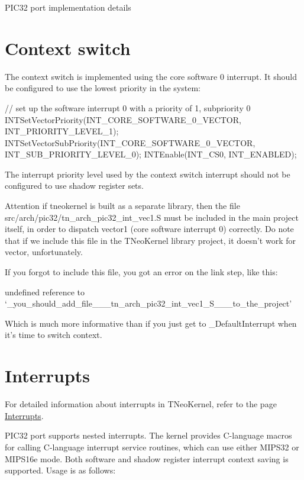 P\+I\+C32 port implementation details\hypertarget{pic32_details_pic32_context_switch}{}\section{Context switch}\label{pic32_details_pic32_context_switch}
The context switch is implemented using the core software 0 interrupt. It should be configured to use the lowest priority in the system\+:


\begin{DoxyCode}
\textcolor{comment}{// set up the software interrupt 0 with a priority of 1, subpriority 0}
INTSetVectorPriority(INT\_CORE\_SOFTWARE\_0\_VECTOR, INT\_PRIORITY\_LEVEL\_1);
INTSetVectorSubPriority(INT\_CORE\_SOFTWARE\_0\_VECTOR, INT\_SUB\_PRIORITY\_LEVEL\_0);
INTEnable(INT\_CS0, INT\_ENABLED);
\end{DoxyCode}


The interrupt priority level used by the context switch interrupt should not be configured to use shadow register sets.

\begin{DoxyAttention}{Attention}
if tneokernel is built as a separate library, then the file {\ttfamily src/arch/pic32/tn\+\_\+arch\+\_\+pic32\+\_\+int\+\_\+vec1.\+S} must be included in the main project itself, in order to dispatch vector1 (core software interrupt 0) correctly. Do note that if we include this file in the T\+Neo\+Kernel library project, it doesn't work for vector, unfortunately.

If you forgot to include this file, you got an error on the link step, like this\+: 
\begin{DoxyCode}
undefined reference to `\_you\_should\_add\_file\_\_\_tn\_arch\_pic32\_int\_vec1\_S\_\_\_to\_the\_project\textcolor{stringliteral}{'}
\end{DoxyCode}
 Which is much more informative than if you just get to {\ttfamily \+\_\+\+Default\+Interrupt} when it's time to switch context.
\end{DoxyAttention}
\hypertarget{pic32_details_pic32_interrupts}{}\section{Interrupts}\label{pic32_details_pic32_interrupts}
For detailed information about interrupts in T\+Neo\+Kernel, refer to the page \hyperlink{interrupts}{Interrupts}.

P\+I\+C32 port supports nested interrupts. The kernel provides C-\/language macros for calling C-\/language interrupt service routines, which can use either M\+I\+P\+S32 or M\+I\+P\+S16e mode. Both software and shadow register interrupt context saving is supported. Usage is as follows\+:


